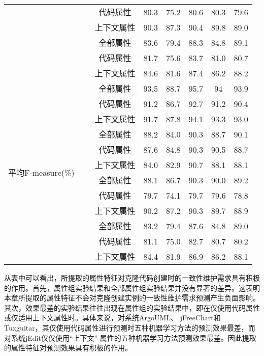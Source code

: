 \begin{table} [htbp]
\begin{tabular}{cccccccc}
&  &代码属性 & 80.3    & 75.2  & 80.6 & 80.3 & 79.6 \\
&   &  上下文属性 & 90.3    & 87.3  & 90.4 & 89.8 & 89.0  \\
&~\multirow{3}{*}{Tuxguitar} 
&全部属性 & 83.6    & 79.4  & 88.3 & 84.8 & 89.1 \\
&   &代码属性 & 81.7    & 75.6  & 83.7 & 81.0  & 80.7 \\
&    & 上下文属性& 84.6    & 81.6  & 87.4 & 86.2 & 88.2 \\
\multirow{12}{*}{平均F-measure(\%)}
&~\multirow{3}{*}{ArgoUML}
& 全部属性 & 93.5    & 88.7  & 95.7 & 94  & 93.9 \\
 &  & 代码属性 & 91.2    & 86.7  & 92.7 & 91.2 & 90.4 \\
 &   &  上下文属性& 91.7    & 87.8  & 94.1 & 93.3 & 93.0  \\
&~\multirow{3}{*}{jEdit} 
& 全部属性 & 88.2    & 84.0   & 90.3 & 88.7 & 90.1 \\
&   &代码属性& 87.6    & 84.8  & 90.3 & 90.5 & 88.7 \\
&   &  上下文属性& 84.0     & 82.9  & 90.7 & 88.1 & 88.1 \\
&~\multirow{3}{*}{jFreeChart} 
&  全部属性& 88.1    & 86.7  & 90.3 & 90.0   & 89.2 \\
&  &代码属性 & 79.7    & 74.1  & 79.7 & 79.6 & 78.8 \\
&   & 上下文属性 & 90.2    & 87.2  & 90.3 & 89.7 & 88.9 \\
&~\multirow{3}{*}{Tuxguitar} 
&全部属性 & 83.2    & 79.4  & 87.6 & 84.8 & 89.0  \\
&  &代码属性& 81.1    & 75.0   & 82.7 & 80.7 & 80.2 \\
&  & 上下文属性& 84.4    & 81.9  & 86.9 & 86.2 & 88.1\\
\bottomrule[1.5pt]
\end{tabular}
\end{table} 

从表中可以看出，所提取的属性特征对克隆代码创建时的一致性维护需求具有积极的作用。首先，属性组实验结果和全部属性组实验结果并没有显著的差异。这表明本章所提取的属性特征不会对克隆创建实例的一致性维护需求预测产生负面影响。其次，效果最差的实验结果往往出现在属性组的实验结果中，即在仅使用代码属性或仅适用上下文属性时。具体来说，对系统ArgoUML、 jFreeChart和 Tuxguitar，其仅使用代码属性进行预测时五种机器学习方法的预测效果最差，而对系统jEdit仅仅使用“上下文” 属性的五种机器学习方法预测效果最差。因此提取的属性特征对预测效果具有积极的作用。

